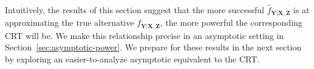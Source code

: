 \documentclass[ejs]{imsart}
\numberwithin{equation}{section}
\theoremstyle{plain}
\theoremstyle{definition}
\theoremstyle{remark}
\newcommand{\prx}{\bm X}
\newcommand{\prz}{\bm Z}
\newcommand{\pry}{{\bm Y}}
\begin{document}
%

\paragraph*{}
Intuitively, the results of this section suggest that the more successful $\widehat f_{\pry|\prx,\prz}$ is at approximating the true alternative $f_{\pry|\prx,\prz}$, the more powerful the corresponding CRT will be. We make this relationship precise in an asymptotic setting in Section~\ref{sec:asymptotic-power}. We prepare for these results in the next section by exploring an easier-to-analyze asymptotic equivalent to the CRT.
\end{document}
